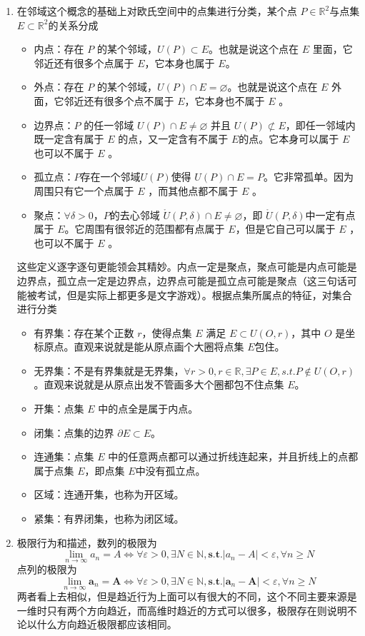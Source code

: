 \begin{enumerate}
\item 在邻域这个概念的基础上对欧氏空间中的点集进行分类，某个点 $P\in \mathbb{R}^2$与点集 $E \subset \mathbb{R}^2$的关系分成
\begin{itemize}
    \item 内点：存在 $P$ 的某个邻域，$U(P) \subset E$。也就是说这个点在 $E$ 里面，它邻近还有很多个点属于 $E$，它本身也属于 $E$。
    \item 外点：存在 $P$ 的某个邻域，$U(P) \cap E = \varnothing$。也就是说这个点在 $E$ 外面，它邻近还有很多个点不属于 $E$，它本身也不属于 $E$ 。
    \item 边界点：$P$ 的任一邻域 $U(P) \cap E \ne \varnothing$ 并且 $U(P) \not\subset E$，即任一邻域内既一定含有属于 $E$ 的点，又一定含有不属于 $E$的点。它本身可以属于 $E$ 也可以不属于 $E$ 。
    \item 孤立点：$P$存在一个邻域$U(P)$使得 $U(P) \cap E = P$。它非常孤单。因为周围只有它一个点属于 $E$ ，而其他点都不属于 $E$ 。
    \item 聚点：$\forall \delta >0$，$P$的去心邻域 $\mathring{U}(P, \delta) \cap E \neq \varnothing$，即 $\mathring{U}(P, \delta)$中一定有点属于 $E$。它周围有很邻近的范围都有点属于 $E$，但是它自己可以属于 $E$ ，也可以不属于 $E$ 。
\end{itemize}
这些定义逐字逐句更能领会其精妙。内点一定是聚点，聚点可能是内点可能是边界点，孤立点一定是边界点，边界点可能是孤立点可能是聚点（这三句话可能被考试，但是实际上都更多是文字游戏）。根据点集所属点的特征，对集合进行分类
\begin{itemize}
    \item 有界集：存在某个正数 $r$，使得点集 $E$ 满足 $E \subset U(O,r)$，其中 $O$ 是坐标原点。直观来说就是能从原点画个大圈将点集 $E$包住。
    \item 无界集：不是有界集就是无界集，$\forall r >0 , r \in \mathbb{R}, \exists P \in E, s.t. P \notin U(O,r)$。直观来说就是从原点出发不管画多大个圈都包不住点集  $E$。
    \item 开集：点集 $E$ 中的点全是属于内点。
    \item 闭集：点集的边界 $\partial E \subset E$。
    \item 连通集：点集 $E$ 中的任意两点都可以通过折线连起来，并且折线上的点都属于点集 $E$，即点集 $E$中没有孤立点。
    \item 区域：连通开集，也称为开区域。
    \item 紧集：有界闭集，也称为闭区域。
\end{itemize}

\item 极限行为和描述，数列的极限为
$$
\lim_{n \to \infty} a_n = A \Leftrightarrow \forall \varepsilon>0,\exists N \in\mathbb{N},\mathbf{s.t.}|a_n-A|<\varepsilon,\forall n\geq N
$$
点列的极限为
$$
\lim_{n \to \infty} \mathbf{a}_n = \mathbf{A} \Leftrightarrow \forall \varepsilon>0,\exists N \in\mathbb{N},\mathbf{s.t.}|\mathbf{a}_n- \mathbf{A}|<\varepsilon,\forall n\geq N
$$
两者看上去相似，但是趋近行为上面可以有很大的不同，这个不同主要来源是一维时只有两个方向趋近，而高维时趋近的方式可以很多，极限存在则说明不论以什么方向趋近极限都应该相同。


\end{enumerate}
